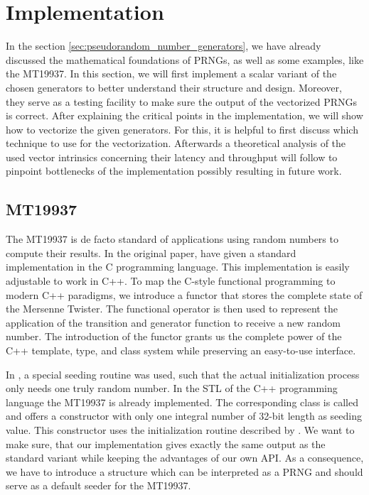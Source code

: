 \documentclass{stdlocal}
\begin{document}
\section{Implementation} %
\label{sec:implementation}
  In the section \ref{sec:pseudorandom_number_generators}, we have already discussed the mathematical foundations of PRNGs, as well as some examples, like the MT19937.
  In this section, we will first implement a scalar variant of the chosen generators to better understand their structure and design.
  Moreover, they serve as a testing facility to make sure the output of the vectorized PRNGs is correct.
  After explaining the critical points in the implementation, we will show how to vectorize the given generators.
  For this, it is helpful to first discuss which technique to use for the vectorization.
  Afterwards a theoretical analysis of the used vector intrinsics concerning their latency and throughput will follow to pinpoint bottlenecks of the implementation possibly resulting in future work.

  \subsection{MT19937} %
  \label{sub:mersenne_twister}
    The MT19937 is de facto standard of applications using random numbers to compute their results.
    In the original paper, \citeauthor{matsumoto1998} have given a standard implementation in the C programming language.
    This implementation is easily adjustable to work in C++.
    To map the C-style functional programming to modern C++ paradigms, we introduce a functor that stores the complete state of the Mersenne Twister.
    The functional operator is then used to represent the application of the transition and generator function to receive a new random number.
    The introduction of the functor grants us the complete power of the C++ template, type, and class system while preserving an easy-to-use interface.

    In \textcite{kneusel2018}, a special seeding routine was used, such that the actual initialization process only needs one truly random number.
    In the STL of the C++ programming language the MT19937 is already implemented.
    The corresponding class is called  and offers a constructor with only one integral number of 32-bit length as seeding value.
    This constructor uses the initialization routine described by \textcite{kneusel2018}.
    We want to make sure, that our implementation gives exactly the same output as the standard variant while keeping the advantages of our own API.
    As a consequence, we have to introduce a structure which can be interpreted as a PRNG and should serve as a default seeder for the MT19937.
\end{document}
